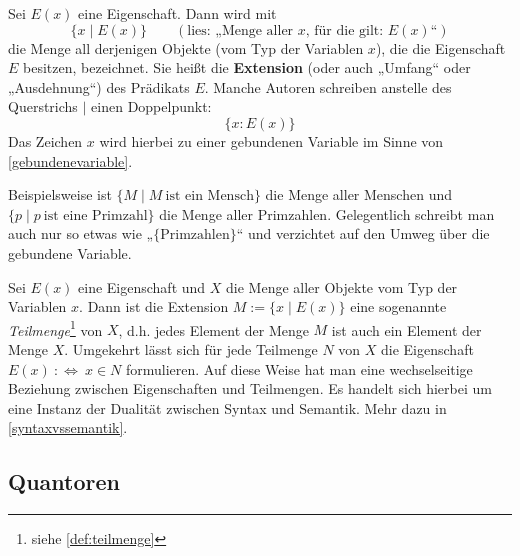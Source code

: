 \begin{nota} \label{extensionimlogikkapitel}
    Sei $E(x)$ eine Eigenschaft. Dann wird mit
        \[ \{ x\mid E(x) \} \qquad (\text{lies: „Menge aller $x$, für die gilt: $E(x)$“})\]
    die Menge all derjenigen Objekte (vom Typ der Variablen $x$), die die Eigenschaft $E$ besitzen, bezeichnet. Sie heißt die \textbf{Extension} (oder auch „Umfang“ oder „Ausdehnung“) des Prädikats $E$. Manche Autoren schreiben anstelle des Querstrichs $\vert$ einen Doppelpunkt:
        \[ \{x: E(x) \}\]
    Das Zeichen $x$ wird hierbei zu einer gebundenen Variable im Sinne von \cref{gebundenevariable}.
\end{nota}


\begin{bsp}
    Beispielsweise ist $\{M\mid M\ \text{ist ein Mensch}\}$ die Menge aller Menschen und $\{p\mid p\ \text{ist eine Primzahl}\}$ die Menge aller Primzahlen. Gelegentlich schreibt man auch nur so etwas wie „$\{\text{Primzahlen}\}$“ und verzichtet auf den Umweg über die gebundene Variable.
\end{bsp}


\begin{bem} \label{mengenvseig}
    Sei $E(x)$ eine Eigenschaft und $X$ die Menge aller Objekte vom Typ der Variablen $x$. Dann ist die Extension $M:=\{x\mid E(x)\}$ eine sogenannte \emph{Teilmenge}\footnote{siehe \cref{def:teilmenge}} von $X$, d.h. jedes Element der Menge $M$ ist auch ein Element der Menge $X$. Umgekehrt lässt sich für jede Teilmenge $N$ von $X$ die Eigenschaft $E(x)\ :\Leftrightarrow\ x\in N$ formulieren. Auf diese Weise hat man eine wechselseitige Beziehung zwischen Eigenschaften und Teilmengen. Es handelt sich hierbei um eine Instanz der Dualität zwischen Syntax und Semantik. Mehr dazu in \cref{syntaxvssemantik}.
\end{bem}





\subsection*{Quantoren}


